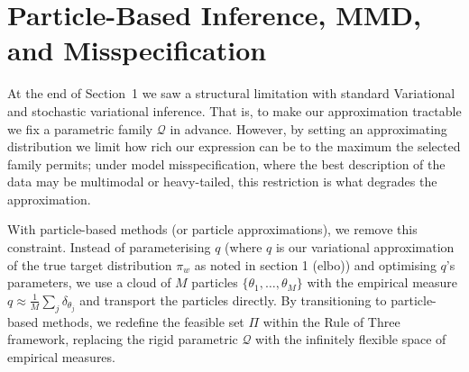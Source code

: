 \documentclass[mstat,12pt]{unswthesis}
\newcommand{\add}[1]{{\color{red}#1}}
\begin{document}


\section{Particle-Based Inference, MMD, and Misspecification}

At the end of Section~1 we saw a structural limitation with standard Variational and stochastic variational inference. That is, to make our approximation tractable we fix a parametric family $\mathcal{Q}$ in advance. However, by setting an approximating distribution we limit how rich our expression can be to the maximum
the selected family permits; under model misspecification, where the best description of the data may be multimodal or heavy-tailed, this restriction is what degrades the approximation.

With particle-based methods (or particle approximations), we remove this constraint. Instead of parameterising $q$ (where $q$ is our variational approximation of the true target distribution $\pi_w$ as noted in section 1 (elbo)) and optimising $q$'s parameters, we use a cloud of $M$ particles $\{\theta_1,\dots,\theta_M\}$ with the
empirical measure $q \approx \tfrac{1}{M}\sum_{j} \delta_{\theta_j}$ and transport the particles
directly. By transitioning to particle-based methods, we redefine the feasible set $\Pi$ within the Rule of Three framework, replacing the rigid parametric $\mathcal{Q}$ with the infinitely flexible space of empirical measures.
\end{document}
